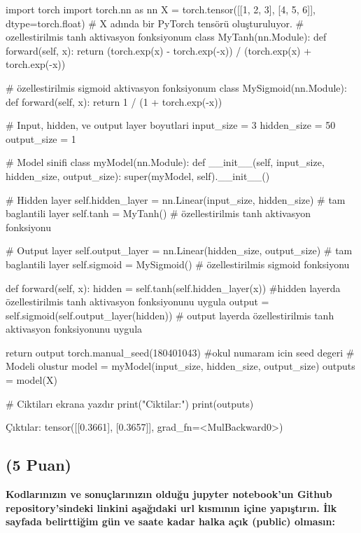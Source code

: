 \documentclass[11pt]{article}
\begin{document}
\begin{python}
import torch
import torch.nn as nn
X = torch.tensor([[1, 2, 3], [4, 5, 6]], dtype=torch.float) # X adında bir PyTorch tensörü oluşturuluyor.
# ozellestirilmis  tanh aktivasyon fonksiyonum
class MyTanh(nn.Module):
    def forward(self, x):
        return (torch.exp(x) - torch.exp(-x)) / (torch.exp(x) + torch.exp(-x))

# özellestirilmis sigmoid aktivasyon fonksiyonum
class MySigmoid(nn.Module):
    def forward(self, x):
        return 1 / (1 + torch.exp(-x))

# Input, hidden, ve output layer boyutlari
input_size = 3
hidden_size = 50
output_size = 1

# Model sinifi
class myModel(nn.Module):
    def __init__(self, input_size, hidden_size, output_size):
        super(myModel, self).__init__()

        # Hidden layer
        self.hidden_layer = nn.Linear(input_size, hidden_size) # tam baglantili layer
        self.tanh = MyTanh() # özellestirilmis tanh aktivasyon fonksiyonu

        # Output layer
        self.output_layer = nn.Linear(hidden_size, output_size) # tam baglantili layer
        self.sigmoid = MySigmoid() # özellestirilmis sigmoid fonksiyonu

    def forward(self, x):
        hidden = self.tanh(self.hidden_layer(x)) #hidden layerda  özellestirilmis tanh aktivasyon fonksiyonunu uygula
        output = self.sigmoid(self.output_layer(hidden)) # output layerda  özellestirilmis tanh aktivasyon fonksiyonunu uygula
        
        return output
        torch.manual_seed(180401043) #okul numaram icin seed degeri
# Modeli olustur
model = myModel(input_size, hidden_size, output_size)
outputs = model(X)

# Ciktiları ekrana yazdır
print("Ciktilar:")
print(outputs)

\end{python}

Çıktılar:
tensor([[0.3661],
        [0.3657]], grad_fn=<MulBackward0>)

\subsection{(5 Puan)} \textbf{Kodlarınızın ve sonuçlarınızın olduğu jupyter notebook'un Github repository'sindeki linkini aşağıdaki url kısmının içine yapıştırın. İlk sayfada belirttiğim gün ve saate kadar halka açık (public) olmasın:}
\end{document}
